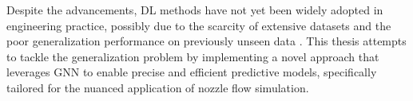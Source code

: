 Despite the advancements, DL methods have not yet been widely adopted in engineering practice, possibly due to the scarcity of extensive datasets and the poor generalization performance on previously unseen data \cite{brenner2019perspective}. This thesis attempts to tackle the generalization problem by implementing a novel approach that leverages \gls{GNN} to enable precise and efficient predictive models, specifically tailored for the nuanced application of nozzle flow simulation.

